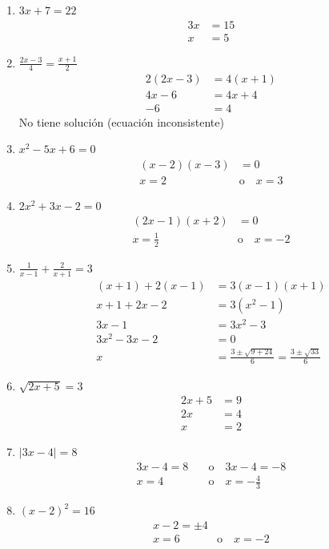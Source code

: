 \documentclass[12pt,a4paper]{article}
\begin{document}
\begin{enumerate}
    \item $3x + 7 = 22$
    \begin{align*}
        3x &= 15\\
        x &= 5
    \end{align*}
    
    \item $\frac{2x - 3}{4} = \frac{x + 1}{2}$
    \begin{align*}
        2(2x - 3) &= 4(x + 1)\\
        4x - 6 &= 4x + 4\\
        -6 &= 4
    \end{align*}
    No tiene solución (ecuación inconsistente)
    
    \item $x^2 - 5x + 6 = 0$
    \begin{align*}
        (x - 2)(x - 3) &= 0\\
        x = 2 \quad &\text{o} \quad x = 3
    \end{align*}
    
    \item $2x^2 + 3x - 2 = 0$
    \begin{align*}
        (2x - 1)(x + 2) &= 0\\
        x = \frac{1}{2} \quad &\text{o} \quad x = -2
    \end{align*}
    
    \item $\frac{1}{x - 1} + \frac{2}{x + 1} = 3$
    \begin{align*}
        (x + 1) + 2(x - 1) &= 3(x - 1)(x + 1)\\
        x + 1 + 2x - 2 &= 3(x^2 - 1)\\
        3x - 1 &= 3x^2 - 3\\
        3x^2 - 3x - 2 &= 0\\
        x &= \frac{3 \pm \sqrt{9 + 24}}{6} = \frac{3 \pm \sqrt{33}}{6}
    \end{align*}
    
    \item $\sqrt{2x + 5} = 3$
    \begin{align*}
        2x + 5 &= 9\\
        2x &= 4\\
        x &= 2
    \end{align*}
    
    \item $|3x - 4| = 8$
    \begin{align*}
        3x - 4 = 8 \quad &\text{o} \quad 3x - 4 = -8\\
        x = 4 \quad &\text{o} \quad x = -\frac{4}{3}
    \end{align*}
    
    \item $(x - 2)^2 = 16$
    \begin{align*}
        x - 2 = \pm 4\\
        x = 6 \quad &\text{o} \quad x = -2
    \end{align*}
\end{enumerate}
\end{document}
